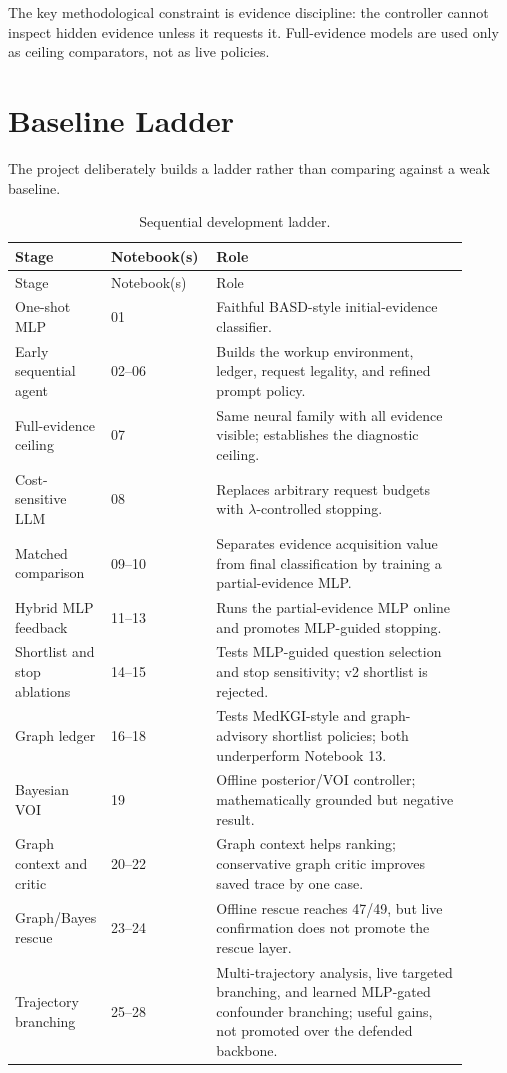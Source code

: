 \documentclass[11pt]{article}
\begin{document}
The key methodological constraint is evidence discipline: the controller cannot inspect hidden evidence unless it requests it. Full-evidence models are used only as ceiling comparators, not as live policies.

\section{Baseline Ladder}

The project deliberately builds a ladder rather than comparing against a weak baseline.

\begin{longtable}{p{0.12\linewidth} p{0.23\linewidth} p{0.55\linewidth}}
\caption{Sequential development ladder.}\\
\toprule
Stage & Notebook(s) & Role \\
\midrule
\endfirsthead
\toprule
Stage & Notebook(s) & Role \\
\midrule
\endhead
One-shot MLP & 01 & Faithful BASD-style initial-evidence classifier. \\
Early sequential agent & 02--06 & Builds the workup environment, ledger, request legality, and refined prompt policy. \\
Full-evidence ceiling & 07 & Same neural family with all evidence visible; establishes the diagnostic ceiling. \\
Cost-sensitive LLM & 08 & Replaces arbitrary request budgets with $\lambda$-controlled stopping. \\
Matched comparison & 09--10 & Separates evidence acquisition value from final classification by training a partial-evidence MLP. \\
Hybrid MLP feedback & 11--13 & Runs the partial-evidence MLP online and promotes MLP-guided stopping. \\
Shortlist and stop ablations & 14--15 & Tests MLP-guided question selection and stop sensitivity; v2 shortlist is rejected. \\
Graph ledger & 16--18 & Tests MedKGI-style and graph-advisory shortlist policies; both underperform Notebook 13. \\
Bayesian VOI & 19 & Offline posterior/VOI controller; mathematically grounded but negative result. \\
Graph context and critic & 20--22 & Graph context helps ranking; conservative graph critic improves saved trace by one case. \\
Graph/Bayes rescue & 23--24 & Offline rescue reaches 47/49, but live confirmation does not promote the rescue layer. \\
Trajectory branching & 25--28 & Multi-trajectory analysis, live targeted branching, and learned MLP-gated confounder branching; useful gains, not promoted over the defended backbone. \\
\bottomrule
\end{longtable}
\end{document}
